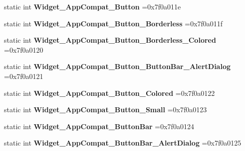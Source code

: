 \begin{DoxyCompactItemize}
static int {\bfseries Widget\+\_\+\+App\+Compat\+\_\+\+Button} =0x7f0a011e
\item 
\mbox{\label{classandroid_1_1support_1_1v7_1_1appcompat_1_1R_1_1style_a6b8cbf5b1db21efa0c2a412c4dcba081}} 
static int {\bfseries Widget\+\_\+\+App\+Compat\+\_\+\+Button\+\_\+\+Borderless} =0x7f0a011f
\item 
\mbox{\label{classandroid_1_1support_1_1v7_1_1appcompat_1_1R_1_1style_a5d8d6746c69345785dc181d3de60fe3a}} 
static int {\bfseries Widget\+\_\+\+App\+Compat\+\_\+\+Button\+\_\+\+Borderless\+\_\+\+Colored} =0x7f0a0120
\item 
\mbox{\label{classandroid_1_1support_1_1v7_1_1appcompat_1_1R_1_1style_a14e564011493db71f56924bbec084813}} 
static int {\bfseries Widget\+\_\+\+App\+Compat\+\_\+\+Button\+\_\+\+Button\+Bar\+\_\+\+Alert\+Dialog} =0x7f0a0121
\item 
\mbox{\label{classandroid_1_1support_1_1v7_1_1appcompat_1_1R_1_1style_af7737ba95142260c18130c96992e805b}} 
static int {\bfseries Widget\+\_\+\+App\+Compat\+\_\+\+Button\+\_\+\+Colored} =0x7f0a0122
\item 
\mbox{\label{classandroid_1_1support_1_1v7_1_1appcompat_1_1R_1_1style_a52f04837b27fe60e25f28b9d94d8e698}} 
static int {\bfseries Widget\+\_\+\+App\+Compat\+\_\+\+Button\+\_\+\+Small} =0x7f0a0123
\item 
\mbox{\label{classandroid_1_1support_1_1v7_1_1appcompat_1_1R_1_1style_a28d9245e0eb311f2b28757d3232fd98b}} 
static int {\bfseries Widget\+\_\+\+App\+Compat\+\_\+\+Button\+Bar} =0x7f0a0124
\item 
\mbox{\label{classandroid_1_1support_1_1v7_1_1appcompat_1_1R_1_1style_af6752243896eeeab9c3130d5c6b36564}} 
static int {\bfseries Widget\+\_\+\+App\+Compat\+\_\+\+Button\+Bar\+\_\+\+Alert\+Dialog} =0x7f0a0125
\item 

\end{DoxyCompactItemize}
